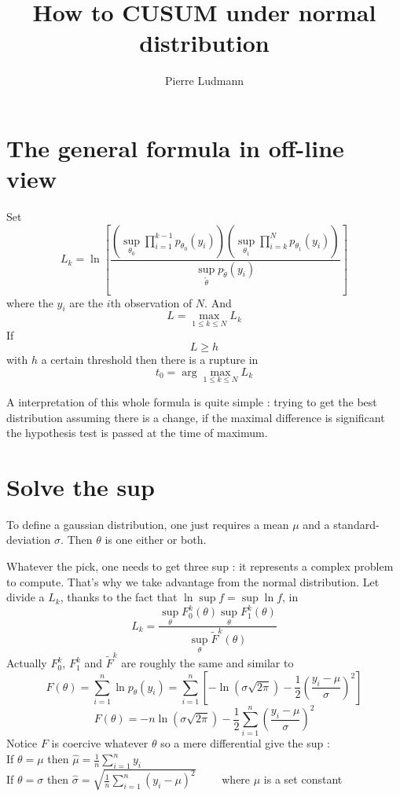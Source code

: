\documentclass[11pt]{article}
\title{\textbf{How to CUSUM under normal distribution}}
\author{Pierre Ludmann}
\begin{document}
\maketitle

\section{The general formula in off-line view}

Set
\[L_k=\ln\left[\frac{\left(\sup_{\theta_0}\prod_{i=1}^{k-1}p_{\theta_0}(y_i)\right)\left(\sup_{\theta_1}\prod_{i=k}^Np_{\theta_1}(y_i)\right)}{\sup_{\tilde\theta}p_{\tilde\theta}(y_i)}\right]\]
where the $y_i$ are the $i$th observation of $N$.
And
\[L=\max_{1\le k\le N}L_k\]
If \[L\ge h\] with $h$ a certain threshold then there is a rupture in \[t_0=\arg\max_{1\le k\le N}L_k\]

A interpretation of this whole formula is quite simple : trying to get the best distribution assuming there is a change, if the maximal difference is significant the hypothesis test is passed at the time of maximum.

\section{Solve the sup}

To define a gaussian distribution, one just requires a mean $\mu$ and a standard-deviation $\sigma$. Then $\theta$ is one either or both.

Whatever the pick, one needs to get three sup : it represents a complex problem to compute. That's why we take advantage from the normal distribution.
Let divide a $L_k$, thanks to the fact that $\ln\sup f=\sup\ln f$, in
\[L_k=\frac{\sup_\theta F^k_0(\theta)\sup_\theta F^k_1(\theta)}{\sup_\theta\tilde F^k(\theta)}\]
Actually $F^k_0$, $F^k_1$ and $\tilde F^k$ are roughly the same and similar to
\[F(\theta)=\sum_{i=1}^n\ln p_\theta(y_i)=\sum_{i=1}^n\left[-\ln(\sigma\sqrt{2\pi})-\frac 12\left(\frac{y_i-\mu}\sigma\right)^2\right]\]
\[F(\theta)=-n\ln(\sigma\sqrt{2\pi})-\frac 12\sum_{i=1}^n\left(\frac{y_i-\mu}\sigma\right)^2\]
Notice $F$ is coercive whatever $\theta$ so a mere differential give the sup :
\\

If $\theta=\mu$ then $\hat\mu=\frac 1n\sum_{i=1}^ny_i$\\

If $\theta=\sigma$ then $\hat\sigma=\sqrt{\frac 1n\sum_{i=1}^n(y_i-\mu)^2}$ ~~~~where $\mu$ is a set constant\\
\end{document}
